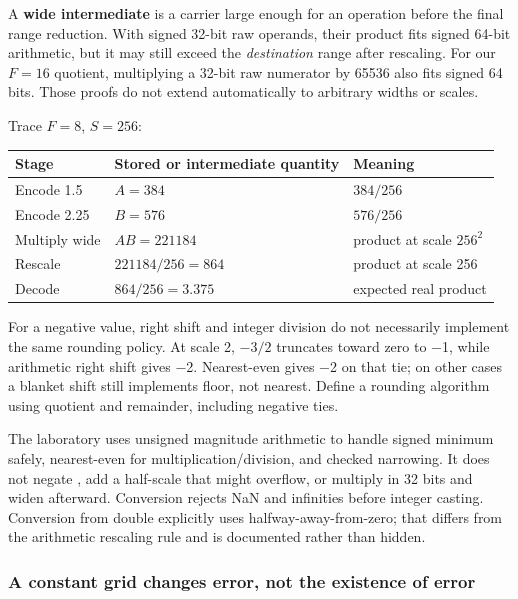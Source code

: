 A \textbf{wide intermediate} is a carrier large enough for an operation before the final range reduction. With signed 32-bit raw operands, their product fits signed 64-bit arithmetic, but it may still exceed the \emph{destination} range after rescaling. For our \(F=16\) quotient, multiplying a 32-bit raw numerator by 65536 also fits signed 64 bits. Those proofs do not extend automatically to arbitrary widths or scales.

Trace \(F=8\), \(S=256\):

{\def\LTcaptype{none} %
\begin{longtable}[]{@{}lll@{}}
\toprule\noalign{}
Stage & Stored or intermediate quantity & Meaning \\
\midrule\noalign{}
\endhead
\bottomrule\noalign{}
\endlastfoot
Encode 1.5 & \(A=384\) & \(384/256\) \\
Encode 2.25 & \(B=576\) & \(576/256\) \\
Multiply wide & \(AB=221184\) & product at scale \(256^2\) \\
Rescale & \(221184/256=864\) & product at scale 256 \\
Decode & \(864/256=3.375\) & expected real product \\
\end{longtable}
}

For a negative value, right shift and integer division do not necessarily implement the same rounding policy. At scale 2, \(-3/2\) truncates toward zero to −1, while arithmetic right shift gives −2. Nearest-even gives −2 on that tie; on other cases a blanket shift still implements floor, not nearest. Define a rounding algorithm using quotient and remainder, including negative ties.

The laboratory uses unsigned magnitude arithmetic to handle signed minimum safely, nearest-even for multiplication/division, and checked narrowing. It does not negate , add a half-scale that might overflow, or multiply in 32 bits and widen afterward. Conversion rejects NaN and infinities before integer casting. Conversion from double explicitly uses halfway-away-from-zero; that differs from the arithmetic rescaling rule and is documented rather than hidden.

\subsubsection{A constant grid changes error, not the existence of error}\label{05-engine-i-ch001-a-constant-grid-changes-error-not-the-existence-of-error}

